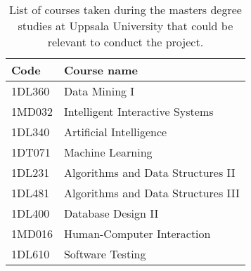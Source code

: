 \begin{table}[ht]
  \centering
  \begin{tabularx}{\textwidth}{|l|X|}
    \hline
    Code & Course name \\
    \hline
    1DL360 & Data Mining I \\
    1MD032 & Intelligent Interactive Systems \\
    1DL340 & Artificial Intelligence \\
    1DT071 & Machine Learning \\
    1DL231 & Algorithms and Data Structures II \\
    1DL481 & Algorithms and Data Structures III \\
    1DL400 & Database Design II \\
    1MD016 & Human-Computer Interaction \\
    1DL610 & Software Testing \\
    \hline
  \end{tabularx}
  \caption{List of courses taken during the masters degree studies at Uppsala University that could be relevant to conduct the project.}
  \label{approach:relevant_courses}
\end{table}